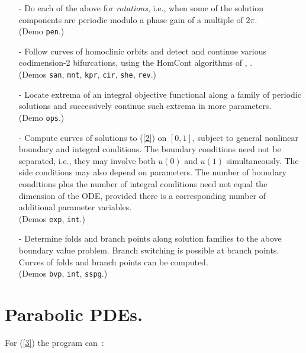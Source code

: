 \documentclass[12pt]{report}
\begin{document}
\begin{itemize}
\item[-]  Do each of the above for {\it rotations}, i.e., when some of the
  solution components are periodic modulo a phase gain of a
  multiple of $2 \pi$. \\
  (Demo {\tt pen}.)
\item[-]  Follow curves of homoclinic orbits and detect and continue
  various codimension-2 bifurcations, using the {\cal HomCont} algorithms of 
   \citeyear{ChKu:94},
   \citeyear{ChKuSa:95}.\\
  (Demos  {\tt san}, {\tt mnt}, {\tt kpr}, {\tt cir},
  {\tt she}, {\tt rev}.)
\item[-]  Locate extrema of an integral objective functional along a family 
  of periodic solutions and successively continue such extrema 
  in more parameters. \\
  (Demo {\tt ops}.)
\item[-]
  Compute curves of solutions to (\ref{2}) on $[0,1]$, subject to general
  nonlinear boundary and integral conditions.
  The boundary conditions need not be separated, i.e., they may
  involve both $u(0)$ and $u(1)$ simultaneously.
  The side conditions may also depend on parameters.
  The number of boundary conditions plus the number of integral
  conditions need not equal the dimension of the ODE, 
  provided there is a corresponding number of additional
  parameter variables. \\
  (Demos {\tt exp}, {\tt int}.)
\item[-]
  Determine folds and branch points along
  solution families to the above boundary value problem.
  Branch switching is possible at branch points.
  Curves of folds and branch points can be computed.\\
  (Demos {\tt bvp}, {\tt int}, {\tt sspg}.)
\end{itemize}
 


\section{ Parabolic PDEs.} \label{sec:Parabolic_PDEs}
For (\ref{3}) the program can~:~
 
\end{document}
